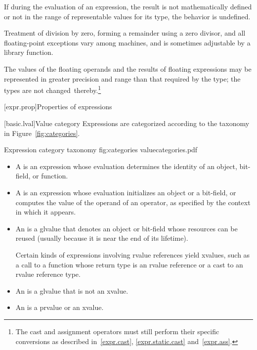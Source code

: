 \pnum
{}%
%
%
%
%
If during the evaluation of an expression, the result is not
mathematically defined or not in the range of representable values for
its type, the behavior is undefined.
\begin{note}
%
Treatment of division by zero, forming a remainder using a zero divisor,
and all floating-point exceptions vary among machines, and is sometimes
adjustable by a library function.
\end{note}

\pnum
The values of the floating operands and the results of floating
expressions may be represented in greater precision and range than that
required by the type; the types are not changed\
thereby.\footnote{The cast and assignment operators must still perform their specific
conversions as described in~\ref{expr.cast}, \ref{expr.static.cast}
and~\ref{expr.ass}.}

[expr.prop]{Properties of expressions}

[basic.lval]{Value category}
\pnum
Expressions are categorized according to the taxonomy in Figure~\ref{fig:categories}.

\begin{importgraphic}
{Expression category taxonomy}
{fig:categories}
{valuecategories.pdf}
\end{importgraphic}

\begin{itemize}
\item A  is an expression whose evaluation determines the identity of an object, bit-field, or function.
\item A \defn{prvalue} is an expression whose evaluation initializes an object or a bit-field,
or computes the value of the operand of an operator,
as specified by the context in which it appears.
\item An  is a glvalue that denotes an object or bit-field whose resources can be reused (usually because it is near the end of its lifetime).
\begin{example}
Certain kinds of expressions involving rvalue references yield xvalues,
such as a call to a function whose return type is an rvalue reference
or a cast to an rvalue reference type.
\end{example}
\item An  is a glvalue that is not an xvalue.
\item An  is a prvalue or an xvalue.
\end{itemize}

